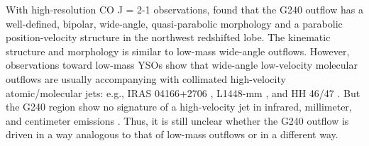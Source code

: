 With high-resolution CO J = 2-1 observations, \citet{2009ApJ...696...66Q} found that the G240 outflow has a well-defined, bipolar, wide-angle, quasi-parabolic morphology and a parabolic position-velocity structure in the northwest redshifted lobe. The kinematic structure and morphology is similar to low-mass wide-angle outflows. However, observations toward low-mass YSOs show that wide-angle low-velocity molecular outflows are usually accompanying with collimated high-velocity atomic/molecular jets: e.g., IRAS 04166+2706 \citep{2009A&A...495..169S}, L1448-mm \citep{2010ApJ...717...58H}, and HH 46/47 \citep{2007ApJ...668L.159V}. But the G240 region show no signature of a high-velocity jet in infrared, millimeter, and centimeter emissions \citep{2002ApJ...576..313K, 2009ApJ...696...66Q, 2011AJ....142..147T}. Thus, it is still unclear whether the G240 outflow is driven in a way analogous to that of low-mass outflows or in a different way.



